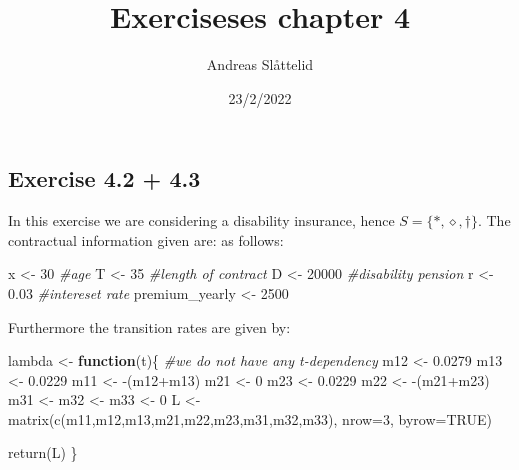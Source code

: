 \documentclass[
]{article}
\title{Exerciseses chapter 4}
\author{Andreas Slåttelid}
\date{23/2/2022}
\newenvironment{Shaded}{\begin{snugshade}}{\end{snugshade}}
\newcommand{\AttributeTok}[1]{\textcolor[rgb]{0.77,0.63,0.00}{#1}}
\newcommand{\CommentTok}[1]{\textcolor[rgb]{0.56,0.35,0.01}{\textit{#1}}}
\newcommand{\ConstantTok}[1]{\textcolor[rgb]{0.00,0.00,0.00}{#1}}
\newcommand{\ControlFlowTok}[1]{\textcolor[rgb]{0.13,0.29,0.53}{\textbf{#1}}}
\newcommand{\DecValTok}[1]{\textcolor[rgb]{0.00,0.00,0.81}{#1}}
\newcommand{\FloatTok}[1]{\textcolor[rgb]{0.00,0.00,0.81}{#1}}
\newcommand{\FunctionTok}[1]{\textcolor[rgb]{0.00,0.00,0.00}{#1}}
\newcommand{\NormalTok}[1]{#1}
\newcommand{\OtherTok}[1]{\textcolor[rgb]{0.56,0.35,0.01}{#1}}
\newcommand{\SpecialCharTok}[1]{\textcolor[rgb]{0.00,0.00,0.00}{#1}}
\begin{document}
\maketitle

\hypertarget{exercise-4.2-4.3}{%
\subsection{Exercise 4.2 + 4.3}\label{exercise-4.2-4.3}}

In this exercise we are considering a disability insurance, hence
\(S = \{*,\diamond ,\dagger \}\). The contractual information given are:
as follows:

\begin{Shaded}
\begin{Highlighting}[]
\NormalTok{x }\OtherTok{\textless{}{-}} \DecValTok{30}     \CommentTok{\#age}
\NormalTok{T }\OtherTok{\textless{}{-}} \DecValTok{35}     \CommentTok{\#length of contract}
\NormalTok{D }\OtherTok{\textless{}{-}} \DecValTok{20000}  \CommentTok{\#disability pension}
\NormalTok{r }\OtherTok{\textless{}{-}} \FloatTok{0.03}   \CommentTok{\#intereset rate}
\NormalTok{premium\_yearly }\OtherTok{\textless{}{-}} \DecValTok{2500}
\end{Highlighting}
\end{Shaded}

Furthermore the transition rates are given by:

\begin{Shaded}
\begin{Highlighting}[]
\NormalTok{lambda }\OtherTok{\textless{}{-}} \ControlFlowTok{function}\NormalTok{(t)\{}
  \CommentTok{\#we do not have any t{-}dependency}
\NormalTok{  m12 }\OtherTok{\textless{}{-}} \FloatTok{0.0279} 
\NormalTok{  m13 }\OtherTok{\textless{}{-}} \FloatTok{0.0229}
\NormalTok{  m11 }\OtherTok{\textless{}{-}} \SpecialCharTok{{-}}\NormalTok{(m12}\SpecialCharTok{+}\NormalTok{m13)}
\NormalTok{  m21 }\OtherTok{\textless{}{-}} \DecValTok{0}
\NormalTok{  m23 }\OtherTok{\textless{}{-}} \FloatTok{0.0229}
\NormalTok{  m22 }\OtherTok{\textless{}{-}} \SpecialCharTok{{-}}\NormalTok{(m21}\SpecialCharTok{+}\NormalTok{m23)}
\NormalTok{  m31 }\OtherTok{\textless{}{-}}\NormalTok{ m32 }\OtherTok{\textless{}{-}}\NormalTok{ m33 }\OtherTok{\textless{}{-}} \DecValTok{0}
\NormalTok{  L }\OtherTok{\textless{}{-}} \FunctionTok{matrix}\NormalTok{(}\FunctionTok{c}\NormalTok{(m11,m12,m13,m21,m22,m23,m31,m32,m33), }\AttributeTok{nrow=}\DecValTok{3}\NormalTok{, }\AttributeTok{byrow=}\ConstantTok{TRUE}\NormalTok{)}
  
  \FunctionTok{return}\NormalTok{(L)}
\NormalTok{\}}
\end{Highlighting}
\end{Shaded}
\end{document}
